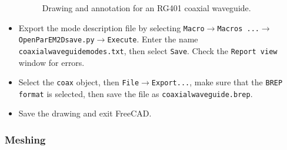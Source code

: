 \documentclass[titlepage]{article}
\renewcommand\_{\textunderscore\linebreak[1]}
\begin{document}
\begin{itemize}
\begin{figure}
  \caption{Drawing and annotation for an RG401 coaxial waveguide.}
  \label{fig:coaxial_drawing}
\end{figure}
\item Export the mode description file by selecting \texttt{Macro}$\rightarrow$\texttt{Macros ...}$\rightarrow$\texttt{OpenParEM2D\_save.py}$\rightarrow$\texttt{Execute}.  Enter the name \texttt{coaxial\_waveguide\_modes.txt}, then select \texttt{Save}.  Check the \texttt{Report view} window for errors.
\item Select the \texttt{coax} object, then \texttt{File}$\rightarrow$\texttt{Export...}, make sure that the \texttt{BREP format} is selected, then save the file as \texttt{coaxial\_waveguide.brep}.
\item Save the drawing and exit FreeCAD.
\end{itemize}

\subsubsection{Meshing}
\end{document}
